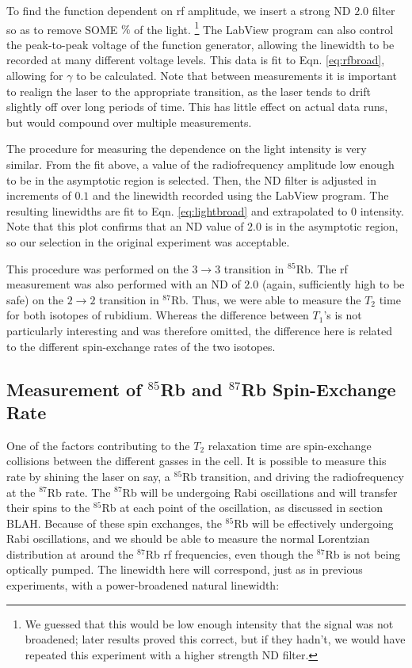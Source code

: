 To find the function dependent on rf amplitude, we insert a strong ND $2.0$ filter so as to remove SOME $\%$ of the light. \footnote{We guessed that this would be low enough intensity that the signal was not broadened; later results proved this correct, but if they hadn't, we would have repeated this experiment with a higher strength ND filter.} The LabView program can also control the peak-to-peak voltage of the function generator, allowing the linewidth to be recorded at many different voltage levels. This data is fit to Eqn. \ref{eq:rfbroad}, allowing for $\gamma$ to be calculated. Note that between measurements it is important to realign the laser to the appropriate transition, as the laser tends to drift slightly off over long periods of time. This has little effect on actual data runs, but would compound over multiple measurements.

The procedure for measuring the dependence on the light intensity is very similar. From the fit above, a value of the radiofrequency amplitude low enough to be in the asymptotic region is selected. Then, the ND filter is adjusted in increments of $0.1$ and the linewidth recorded using the LabView program. The resulting linewidths are fit to Eqn. \ref{eq:lightbroad} and extrapolated to 0 intensity.  Note that this plot confirms that an ND value of $2.0$ is in the asymptotic region, so our selection in the original experiment was acceptable.

This procedure was performed on the $3\rightarrow3$ transition in $^{85}$Rb. The rf measurement was also performed with an ND of $2.0$ (again, sufficiently high to be safe) on the $2\rightarrow2$ transition in $^{87}$Rb. Thus, we were able to measure the $T_{2}$ time for both isotopes of rubidium. Whereas the difference between $T_{1}$'s is not particularly interesting and was therefore omitted, the difference here is related to the different spin-exchange rates of the two isotopes.

\subsection{Measurement of $^{85}$Rb and $^{87}$Rb Spin-Exchange Rate}

One of the factors contributing to the $T_{2}$ relaxation time are spin-exchange collisions between the different gasses in the cell. It is possible to measure this rate by shining the laser on say, a $^{85}$Rb transition, and driving the radiofrequency at the $^{87}$Rb rate. The $^{87}$Rb will be undergoing Rabi oscillations and will transfer their spins to the $^{85}$Rb at each point of the oscillation, as discussed in section BLAH. Because of these spin exchanges, the $^{85}$Rb will be effectively undergoing Rabi oscillations, and we should be able to measure the normal Lorentzian distribution at around the $^{87}$Rb rf frequencies, even though the $^{87}$Rb is not being optically pumped. The linewidth here will correspond, just as in previous experiments, with a power-broadened natural linewidth:

